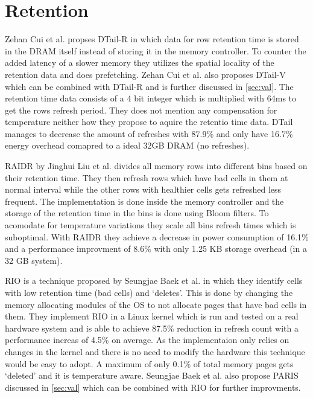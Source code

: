 \section{Retention}
\label{sec:ret}

Zehan Cui et al. \cite{dtail} propses DTail-R in which data for row retention time is stored in the DRAM itself instead of storing it in the memory controller. To counter the added latency of a slower memory they utilizes the spatial locality of the retention data and does prefetching. Zehan Cui et al. also proposes DTail-V which can be combined with DTail-R and is further discussed in \ref{sec:val}. The retention time data consists of a 4 bit integer which is multiplied with 64ms to get the rows refresh period. They does not mention any compensation for temperature neither how they propose to aquire the retentio time data. DTail manages to decrease the amount of refreshes with 87.9\% and only have 16.7\% energy overhead comapred to a ideal 32GB DRAM (no refreshes).

RAIDR by Jinghui Liu et al. \cite{raidr} divides all memory rows into different bins based on their retention time. They then refresh rows which have bad cells in them at normal interval while the other rows with healthier cells gets refreshed less frequent. The implementation is done inside the memory controller and the storage of the retention time in the bins is done using Bloom filters. To acomodate for temperature variations they scale all bins refresh times which is suboptimal. With RAIDR they achieve a decrease in power consumption of 16.1\% and a performance improvment of 8.6\% with only 1.25 KB storage overhead (in a 32 GB system).
  
RIO is a technique proposed by Seungjae Baek et al. \cite{rioparis} in which they identify cells with low retention time (bad cells) and `deletes'. This is done by changing the memory allocating modules of the OS to not allocate pages that have bad cells in them. They implement RIO in a Linux kernel which is run and tested on a real hardware system and is able to achieve 87.5\% reduction in refresh count with a performance increas of 4.5\% on average. As the implementaion only relies on changes in the kernel and there is no need to modify the hardware this technique would be easy to adopt. A maximum of only 0.1\% of total memory pages gets `deleted' and it is temperature aware. Seungjae Baek et al. also propose PARIS discussed in \ref{sec:val} which can be combined with RIO for further improvments.

